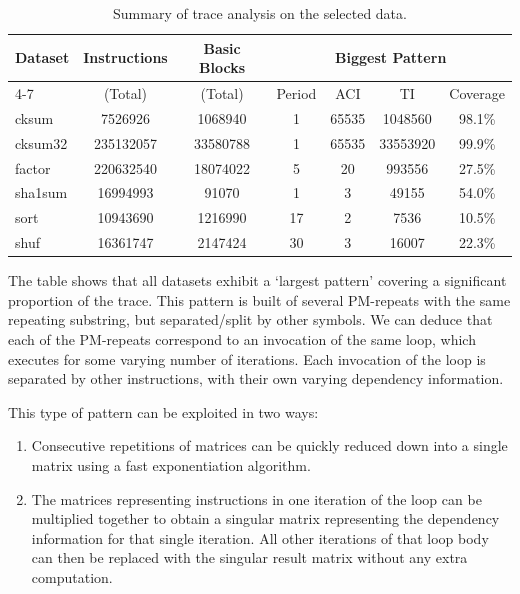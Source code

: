 \begin{table}[ht]
\begin{center}
\begin{tabular}{lcccccc}
  \toprule
  \textbf{Dataset} & \textbf{Instructions} & \textbf{Basic Blocks} & \multicolumn{4}{c}{\textbf{Biggest Pattern}} \\
  \cmidrule(l){4-7}
  & (Total) & (Total) & Period & ACI & TI & Coverage\\
  \midrule
  cksum   & 7526926   & 1068940  & 1  & 65535 & 1048560  & 98.1\% \\
  cksum32 & 235132057 & 33580788 & 1  & 65535 & 33553920 & 99.9\% \\
  factor  & 220632540 & 18074022 & 5  & 20    & 993556   & 27.5\% \\
  sha1sum & 16994993  & 91070    & 1  & 3     & 49155    & 54.0\% \\
  sort    & 10943690  & 1216990  & 17 & 2     & 7536     & 10.5\% \\
  shuf    & 16361747  & 2147424  & 30 & 3     & 16007    & 22.3\% \\
  \bottomrule
\end{tabular}
\end{center}
\caption{Summary of trace analysis on the selected data.}
\label{tbl:trace-analysis}
\end{table}

The table shows that all datasets
exhibit a `largest pattern' covering a significant proportion of the trace. This pattern is built of several PM-repeats 
with the same repeating substring, but separated/split by other symbols. We can deduce that each of the PM-repeats 
correspond to an invocation of the same loop, which executes for some varying number of iterations. Each invocation 
of the loop is separated by other instructions, with their own varying dependency information.

This type of pattern can be exploited in two ways:

\begin{enumerate}
  \item Consecutive repetitions of matrices can be quickly reduced down into a single matrix using a fast exponentiation algorithm.
  \item The matrices representing instructions in one iteration of the loop can be multiplied together to obtain a singular matrix representing 
    the dependency information for that single iteration. All other iterations of that loop body can then be replaced with 
    the singular result matrix without any extra computation.
\end{enumerate}

